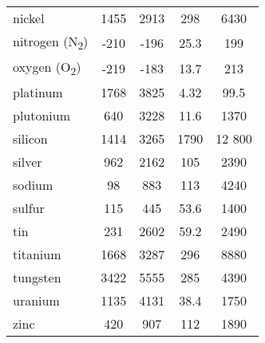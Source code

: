 \begin{center}
\begin{tabu}{ l SSSS }
    nickel      & 1455
                & 2913
                & 298
                & 6430 \\
    nitrogen (N\textsubscript{2})
                & -210
                & -196
                & 25.3
                & 199 \\
    oxygen (O\textsubscript{2})
                & -219
                & -183
                & 13.7
                & 213 \\
    platinum    & 1768
                & 3825
                & 4.32
                & 99.5 \\
    plutonium   & 640
                & 3228
                & 11.6
                & 1370 \\
    silicon     & 1414
                & 3265
                & 1790
                & 12 800 \\
    silver      & 962
                & 2162
                & 105
                & 2390 \\
    sodium      & 98
                & 883
                & 113
                & 4240 \\
    sulfur      & 115
                & 445
                & 53.6
                & 1400 \\
    tin         & 231
                & 2602
                & 59.2
                & 2490 \\
    titanium    & 1668
                & 3287
                & 296
                & 8880 \\
    tungsten    & 3422
                & 5555
                & 285
                & 4390 \\
    uranium     & 1135
                & 4131
                & 38.4
                & 1750 \\
    zinc        & 420
                & 907
                & 112
                & 1890 \\
    \bottomrule
\end{tabu}
\end{center}

